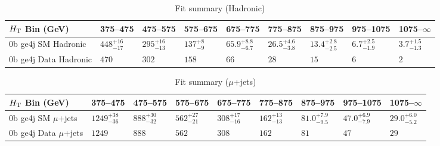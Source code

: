 \documentclass[8pt]{article}
\def\scalht{\mbox{$H_{\rm{T}}$}\xspace}
\newcommand\T{\rule{0pt}{2.6ex}}
\begin{document}
\begin{table}[ht!]
\caption{Fit summary (Hadronic)}
\label{tab:ensemble-summary}
\centering
\begin{tabular}{ lllllllll }

\hline
\scalht Bin (GeV)       & 375--475                       & 475--575                       & 575--675                       & 675--775                       & 775--875                       & 875--975                       & 975--1075                      & 1075--$\infty$                 \\ [1.000000ex]
\hline
0b ge4j SM Hadronic\T   & $448^{+16}_{-17}$              & $295^{+16}_{-13}$              & $137^{+8}_{-9}$                & $65.9^{+8.8}_{-6.7}$           & $26.5^{+4.6}_{-3.8}$           & $13.4^{+2.8}_{-2.5}$           & $6.7^{+2.5}_{-1.9}$            & $3.7^{+1.5}_{-1.3}$            \\ 
0b ge4j Data Hadronic\T & $470$                          & $302$                          & $158$                          & $66$                           & $28$                           & $15$                           & $6$                            & $2$                            \\ 
\hline

\end{tabular}
\end{table}
\begin{table}[ht!]
\caption{Fit summary ($\mu$+jets)}
\label{tab:ensemble-summary}
\centering
\begin{tabular}{ lllllllll }

\hline
\scalht Bin (GeV)       & 375--475                       & 475--575                       & 575--675                       & 675--775                       & 775--875                       & 875--975                       & 975--1075                      & 1075--$\infty$                 \\ [1.000000ex]
\hline
0b ge4j SM $\mu$+jets\T & $1249^{+38}_{-36}$             & $888^{+30}_{-32}$              & $562^{+27}_{-21}$              & $308^{+17}_{-16}$              & $162^{+13}_{-13}$              & $81.0^{+7.9}_{-9.5}$           & $47.0^{+6.9}_{-7.9}$           & $29.0^{+6.0}_{-5.2}$           \\ 
0b ge4j Data $\mu$+jets\T & $1249$                         & $888$                          & $562$                          & $308$                          & $162$                          & $81$                           & $47$                           & $29$                           \\ 
\hline

\end{tabular}
\end{table}
\end{document}
